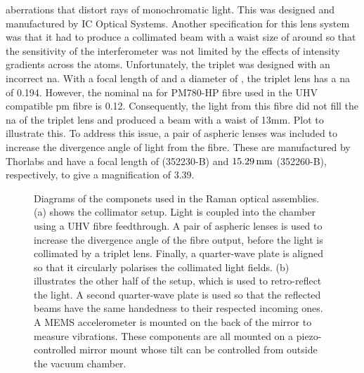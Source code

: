 aberrations that distort rays of monochromatic light. This was designed and
manufactured by IC Optical Systems. Another specification for this lens
system was that it had to produce a collimated beam with a waist size of
around  so that the sensitivity of the
interferometer was not limited by the effects of intensity gradients across
the atoms. Unfortunately, the triplet was designed with an incorrect \ac{na}.
With a focal length of  and a diameter of
, the triplet lens has a \ac{na} of 0.194. However,
the nominal \ac{na} for PM780-HP fibre used in the UHV compatible \ac{pm}
fibre is 0.12. Consequently, the light from this fibre did not fill the
\ac{na} of the triplet lens and produced a beam with a waist of 13mm. {\huge
Plot to illustrate this}. To address this issue, a pair of aspheric lenses
was included to increase the divergence angle of light from the fibre. These
are manufactured by Thorlabs and have a focal length of
 (352230-B) and \(\sivalue{15.29}{\milli\metre}\)
(352260-B), respectively, to give a magnification of 3.39.
\begin{figure}[!htbp]
	\centering
	\def\svgwidth{\columnwidth}
	\subfloat[][]{\scalebox{0.4}{\label{fig:raman_collimator}}}
	\subfloat[][]{\scalebox{0.4}{\label{fig:mirror_mount}}}
	\caption[Drawings of the compenets used in the Raman optics
		assemblies]{Diagrams of the componets used in the Raman optical assemblies.
		(a) shows the collimator setup. Light is coupled into the chamber using a UHV
		fibre feedthrough. A pair of aspheric lenses is used to increase the
		divergence angle of the fibre output, before the light is collimated by a
		triplet lens. Finally, a quarter-wave plate is aligned so that it circularly
		polarises the collimated light fields. (b) illustrates the other half of the
		setup, which is used to retro-reflect the light. A second quarter-wave plate
		is used so that the reflected beams have the same handedness to their
		respected incoming ones. A MEMS accelerometer is mounted on the back of the
		mirror to measure vibrations. These components are all mounted on a
		piezo-controlled mirror mount whose tilt can be controlled from outside the
		vacuum chamber.}
	\label{fig:raman_optics}
\end{figure}

